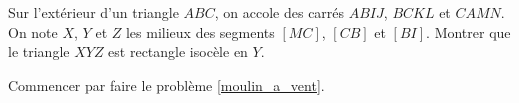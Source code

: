 \begin{exo}%
Sur l'extérieur d'un triangle $ABC$, on accole des carrés $ABIJ$, $BCKL$ et $CAMN$.
On note $X$, $Y$ et $Z$ les milieux des segments $[MC]$, $[CB]$ et $[BI]$.
Montrer que le triangle $XYZ$ est rectangle isocèle en $Y$.
\begin{center}
\end{center}
\begin{hint}
Commencer par faire le problème \ref{moulin_a_vent}.
\end{hint}
\end{exo}





